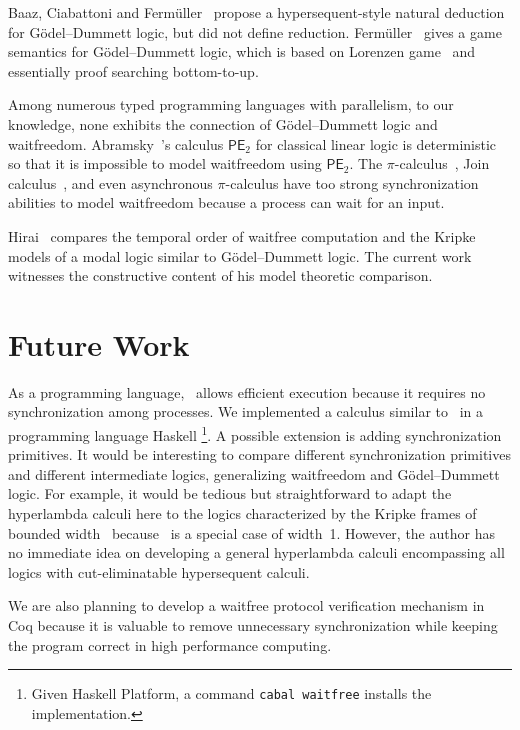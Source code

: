 {Baaz, Ciabattoni and Ferm\"uller~\cite{natural} propose a
hypersequent-style natural deduction for G\"odel--Dummett logic, but
did not define reduction.
Ferm\"uller~\cite{parallel} gives a game semantics for G\"odel--Dummett
logic, which is based on Lorenzen game~\cite{curryhoward} and essentially
proof searching bottom-to-up.

Among numerous typed programming languages with parallelism,
to our knowledge, none exhibits
the connection of G\"odel--Dummett logic and waitfreedom.
Abramsky~\cite{abramsky1993computational}'s calculus $\mathsf{PE}_2$
for classical linear logic is
deterministic
\cite[Theorem~7.9]{abramsky1993computational} so that it is
impossible to model
waitfreedom using $\mathsf{PE}_2$.
The $\pi$-calculus~\cite{milner1999communicating},
Join calculus~\cite{join},
and even asynchronous
$\pi$-calculus \cite{hondatokoro}
have too strong synchronization abilities to model waitfreedom because
a process can wait for an input.

Hirai~\cite{hirailpar} compares the temporal order of waitfree
computation and the Kripke models of a modal logic similar to
G\"odel--Dummett logic.  The current
work witnesses the constructive content of
his model theoretic comparison.

\section{Future Work}
\label{future}

As a programming language, \lgd\, allows efficient execution because it
requires no synchronization among processes.
We implemented a calculus similar to \lgd\, in a programming language
Haskell%
\footnote{Given Haskell Platform, a command \texttt{cabal
waitfree} installs the implementation.}.
A possible extension is adding synchronization primitives.
It would be interesting to compare different synchronization primitives
and different intermediate logics, generalizing waitfreedom and
G\"odel--Dummett logic.
For example, it would be tedious but straightforward to adapt the
hyperlambda calculi here to
the logics characterized by the Kripke frames of bounded
width~\citet{Ciabattoni01042001} because \lgd\, is a special case of
width~1.  However, the author has no immediate idea on
developing a general hyperlambda calculi encompassing
all logics with cut-eliminatable hypersequent calculi.

We are also planning to develop a waitfree protocol verification mechanism in Coq
because it is valuable to
remove unnecessary synchronization while keeping the program correct
in high performance computing.

}
